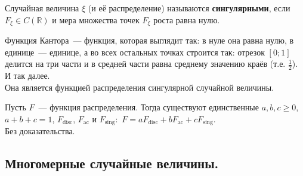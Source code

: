 \documentclass{article}
\begin{document}
    \begin{definition}
        Случайная величина $\xi$ (и её распределение) называются \textbf{сингулярными}, если $F_\xi\in C(\mathbb R)$ и мера множества точек $F_\xi$ роста равна нулю.
    \end{definition}
    \begin{example}
        Функция Кантора~--- функция, которая выглядит так: в нуле она равна нулю, в единице~--- единице, а во всех остальных точках строится так: отрезок $[0;1]$ делится на три части и в средней части равна среднему значению краёв (т.е. $\frac12$). И так далее.\\
        Она является функцией распределения сингулярной случайной величины.
    \end{example}
    \begin{theorem}
        Пусть $F$~--- функция распределения. Тогда существуют единственные $a, b, c \geq 0$, $a+b+c=1$, $F_{\mathrm{disc}}$, $F_{\mathrm{ac}}$ и $F_{\mathrm{sing}}:$ $F=aF_{\mathrm{disc}} +bF_{\mathrm{ac}}+cF_{\mathrm{sing}}$.\\
        Без доказательства.
    \end{theorem}
    \subsection{Многомерные случайные величины.}
\end{document}
